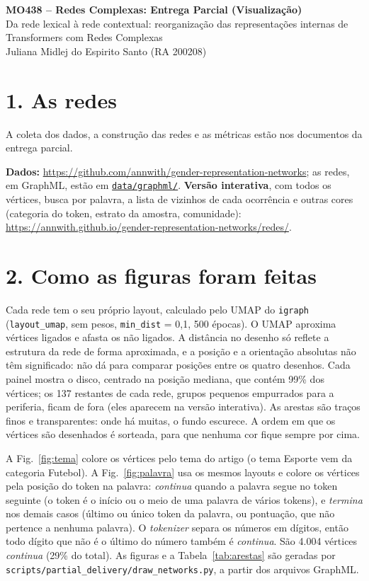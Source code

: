 \documentclass[11pt,a4paper]{article}
\newcommand{\repo}{https://github.com/annwith/gender-representation-networks}
\newcommand{\dados}{\repo/tree/main/data/graphml}
\newcommand{\pagina}{https://annwith.github.io/gender-representation-networks/redes/}
\begin{document}
\begin{center}
    {\large\bfseries MO438 -- Redes Complexas: Entrega Parcial (Visualização)}\\[2pt]
    Da rede lexical à rede contextual: reorganização das representações
    internas de Transformers com Redes Complexas\\[2pt]
    Juliana Midlej do Espirito Santo (RA 200208)
\end{center}

\vspace{-2mm}

\section*{1. As redes}

A coleta dos dados, a construção das redes e as métricas
estão nos documentos da entrega parcial.

\textbf{Dados:} \url{\repo}; as redes, em GraphML, estão em
\href{\dados}{\texttt{data/graphml/}}. \textbf{Versão interativa}, com todos os vértices, busca
por palavra, a lista de vizinhos de cada ocorrência e outras cores (categoria do token, estrato
da amostra, comunidade): \url{\pagina}.

\section*{2. Como as figuras foram feitas}

Cada rede tem o seu próprio layout, calculado pelo UMAP do \texttt{igraph}
(\texttt{layout\_umap}, sem pesos, \texttt{min\_dist} = 0,1, 500 épocas). O UMAP
aproxima vértices ligados e afasta os não ligados. A distância no desenho só reflete a
estrutura da rede de forma aproximada, e a posição e a orientação absolutas não têm
significado: não dá para comparar posições entre os quatro desenhos. Cada painel mostra o
disco, centrado na posição mediana, que contém 99\% dos vértices; os 137 restantes de cada
rede, grupos pequenos empurrados para a periferia, ficam de fora (eles aparecem na versão
interativa). As arestas são traços finos e transparentes: onde há muitas, o fundo escurece. A
ordem em que os vértices são desenhados é sorteada, para que nenhuma cor fique sempre por cima.

A Fig.~\ref{fig:tema} colore os vértices pelo tema do artigo (o tema Esporte vem da categoria
Futebol). A Fig.~\ref{fig:palavra} usa os mesmos layouts e colore os vértices pela posição do
token na palavra: \emph{continua} quando a palavra segue no token seguinte (o token é o início
ou o meio de uma palavra de vários tokens), e \emph{termina} nos demais casos (último ou único
token da palavra, ou pontuação, que não pertence a nenhuma palavra). O \textit{tokenizer} separa
os números em dígitos, então todo dígito que não é o último do número também é
\emph{continua}. São 4.004 vértices \emph{continua} (29\% do total). As figuras e a
Tabela~\ref{tab:arestas} são geradas por
\texttt{scripts/partial\_delivery/draw\_networks.py}, a partir dos arquivos GraphML.
\end{document}
